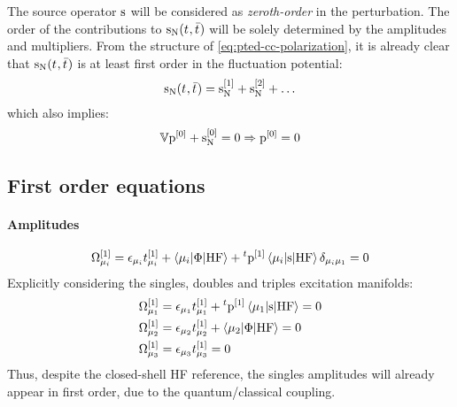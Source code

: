The source operator $\mathrm{s}$ will be considered as \emph{zeroth-order} in
the perturbation.
The order of the contributions to $\mathrm{s}_{\mathrm{N}}(t_{},\bar{t}_{})$ will be
solely determined by the amplitudes and multipliers.
From the structure of \eqref{eq:pted-cc-polarization}, it is already
clear that $\mathrm{s}_{\mathrm{N}}(t_{},\bar{t}_{})$ is at least first order in the
fluctuation potential:
\begin{equation}
  \mathrm{s}_{\mathrm{N}}(t_{},\bar{t}_{}) =
  \mathrm{s}_{\mathrm{N}}^{[1]}
  + \mathrm{s}_{\mathrm{N}}^{[2]}
  + \ldots
\end{equation}
which also implies:
\begin{equation}
  \mathbb{V}\mathrm{p}^{[0]} + \mathrm{s}_{\mathrm{N}}^{[0]} = 0 \Rightarrow  \mathrm{p}^{[0]} = 0
\end{equation}

\subsection{First order equations}\label{sec:first-order-pt}

\paragraph*{Amplitudes}
\begin{equation}\label{eq:1st-order-amp}
  \Omega_{\mu_i}^{[1]} = \epsilon_{\mu_i}t_{\mu_i}^{[1]}
  + \braket{\mu_i | \Phi | \mathrm{HF}}
  + {}^t\mathrm{p}^{[1]}\braket{\mu_i | \mathrm{s} | \mathrm{HF}}\delta_{\mu_i\mu_1}
  = 0
\end{equation}
Explicitly considering the singles, doubles and triples excitation manifolds:
\begin{subequations}
  \begin{align}
  \Omega_{\mu_1}^{[1]} &= \epsilon_{\mu_1}t_{\mu_1}^{[1]}
  + {}^t\mathrm{p}^{[1]}\braket{\mu_1 | \mathrm{s} | \mathrm{HF}}
  = 0 \\
  \Omega_{\mu_2}^{[1]} &= \epsilon_{\mu_2}t_{\mu_2}^{[1]}
  + \braket{\mu_2 | \Phi | \mathrm{HF}}
  = 0 \\
  \Omega_{\mu_3}^{[1]} &= \epsilon_{\mu_3}t_{\mu_3}^{[1]} = 0
  \end{align}
\end{subequations}
Thus, despite the closed-shell \acrshort{HF} reference, the singles
amplitudes will already appear in first order, due to the
quantum/classical coupling.

